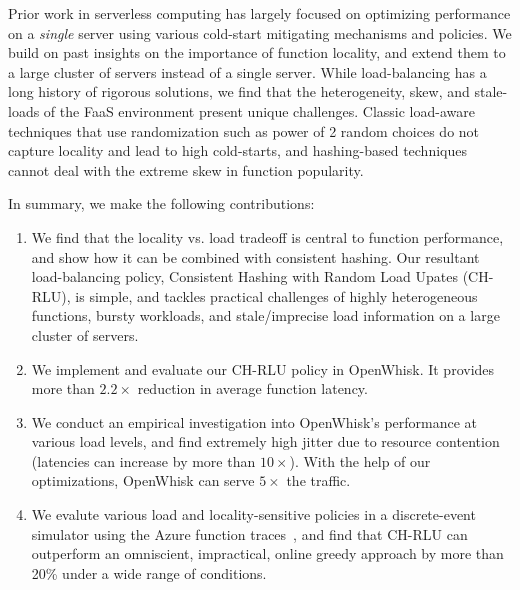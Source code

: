 Prior work in serverless computing has largely focused on optimizing performance on a \emph{single} server using various cold-start mitigating mechanisms and policies. 
We build on past insights on the importance of function locality, and extend them to a large cluster of servers instead of a single server. 
While load-balancing has a long history of rigorous solutions, we find that the heterogeneity, skew, and stale-loads of the FaaS environment present unique challenges. 
Classic load-aware techniques that use randomization such as power of 2 random choices do not capture locality and lead to high cold-starts, and hashing-based techniques cannot deal with the extreme skew in function popularity.



In summary, we make the following contributions:

\begin{enumerate}
\item We find that the locality vs. load tradeoff is central to function performance, and show how it can be combined with consistent hashing. Our resultant load-balancing policy, Consistent Hashing with Random Load Upates (CH-RLU), is simple, and tackles practical challenges of highly heterogeneous functions, bursty workloads, and stale/imprecise load information on a large cluster of servers.
\item We implement and evaluate our CH-RLU policy in OpenWhisk. It provides more than $2.2\times$ reduction in average function latency.
\item We conduct an empirical investigation into OpenWhisk's performance at various load levels, and find extremely high jitter due to resource contention (latencies can increase by more than $10\times$).
  With the help of our optimizations, OpenWhisk can serve $5\times$ the traffic. 
\item We evalute various load and locality-sensitive policies in a discrete-event simulator using the Azure function traces~\cite{shahrad_serverless_2020}, and find that CH-RLU can outperform an omniscient, impractical, online greedy approach by more than 20\% under a wide range of conditions. 
\end{enumerate}

